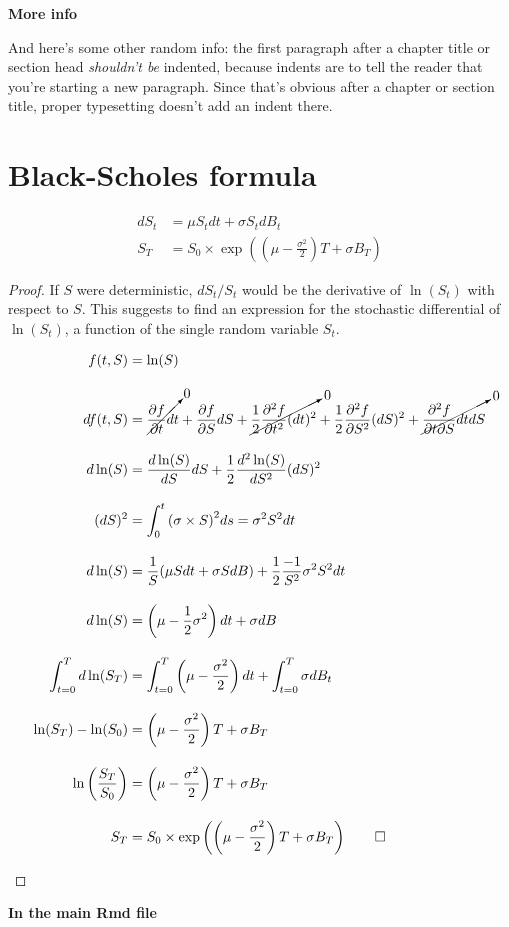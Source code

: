 \documentclass[12pt,twoside]{reedthesis}
\theoremstyle{definition}
\theoremstyle{definition}
\theoremstyle{remark}
\begin{document}
  \textbf{More info}
  
  And here's some other random info: the first paragraph after a chapter
  title or section head \emph{shouldn't be} indented, because indents are
  to tell the reader that you're starting a new paragraph. Since that's
  obvious after a chapter or section title, proper typesetting doesn't add
  an indent there.
  
  \appendix
  
  \chapter{Black-Scholes formula}\label{bsformula}
  \begin{align*}
  dS_t &= \mu S_t dt + \sigma S_t dB_t \\
  S_T &= S_0 \times \exp \left( \left( \mu  - \frac{\sigma^2}{2} \right) T  + \sigma B_T \right)
  \end{align*}
  \begin{proof}
  
  If $S$ were deterministic, $dS_t/S_t$ would be the derivative of $\ln(S_t)$ with respect to $S$. This suggests to find an expression for the stochastic differential of $\ln(S_t)$, a function of the single random variable $S_t$.
  
  \begin{scriptsize}
  \begin{align}
  f(t,S) &= \ln(S) \\[10pt]
  df(t,S) &= \cancelto{0}{\frac{\partial f}{\partial t}dt}  + \frac{\partial f}{\partial S} dS + \cancelto{0}{\frac{1}{2} \frac{\partial^2 f}{\partial t^2} (dt)^2} + \frac{1}{2} \frac{\partial^2 f}{\partial S^2} (dS)^2  + \cancelto{0}{\frac{\partial^2 f}{\partial t \partial S} dt dS} \\[10pt]
  d\ln(S) &= \frac{d\ln(S)}{dS} dS + \frac{1}{2} \frac{d^2\ln(S)}{dS^2}(dS)^2 \\[10pt]
  (dS)^2 &= \int_{0}^{t}{\left(\sigma \times S \right)^2} ds = \sigma^2 S^2 dt \\[10pt]
  d\ln(S) &= \frac{1}{S} (\mu S dt + \sigma S dB) + \frac{1}{2}\frac{-1}{S^2} \sigma^2 S^2 dt \\[10pt]
  d\ln(S) &= \left( \mu -  \frac{1}{2} \sigma^2 \right) dt + \sigma dB \\[10pt]
  \int_{t=0}^{T}{d\ln(S_T)} &= \int_{t=0}^{T}{\left( \mu - \frac{\sigma^2}{2} \right) dt} + \int_{t=0}^{T}{\sigma dB_t} \\[10pt]
  \ln(S_T) - \ln(S_0) &=  \left(\mu  - \frac{\sigma^2}{2} \right)  T + \sigma B_T \\[10pt]
  \ln \left( \frac{S_T}{S_0} \right) &= \left( \mu  - \frac{\sigma^2}{2}  \right) T + \sigma B_T \\[10pt]
  S_T &= S_0 \times \exp \left( \left( \mu  - \frac{\sigma^2}{2} \right) T  + \sigma B_T \right) \qed
  \end{align}
  \end{scriptsize} 
  \end{proof}
  \textbf{In the main Rmd file}
  
\end{document}

